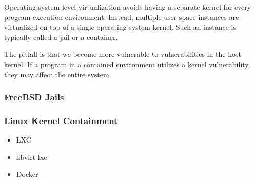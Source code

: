 Operating system-level virtualization avoids having a separate kernel for every
program execution environment. Instead, multiple user space instances are
virtualized on top of a single operating system kernel. Such an instance is
typically called a jail or a container.

The pitfall is that we become more vulnerable to vulnerabilities in the host
kernel. If a program in a contained environment utilizes a kernel
vulnerability, they may affect the entire system.

\subsubsection{FreeBSD Jails}

\subsubsection{Linux Kernel Containment}

\begin{itemize}

\item LXC

\item libvirt-lxc

\item Docker

\end{itemize}

